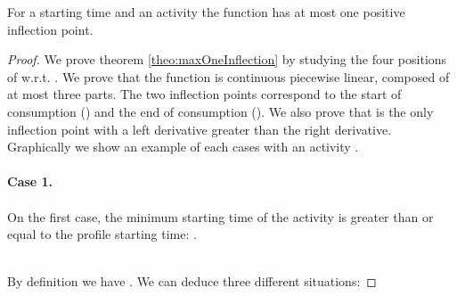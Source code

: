 \documentclass{llncs}
\begin{document}
\begin{theorem}\label{theo:maxOneInflection}
For a starting time  and an activity  the function   has at most one positive inflection point.\end{theorem}
{\small
\begin{proof}
We  prove theorem \ref{theo:maxOneInflection} by studying the four positions of  w.r.t. .
We prove that the function  is continuous piecewise linear, composed of at most three parts.
The two inflection points correspond to the start of consumption () 
and the end of consumption (). We also prove that  is the only inflection point with a left derivative greater than the right derivative.
Graphically we show an example of each cases with an activity .

\paragraph{Case 1.}
\paragraph{}
\hspace{-0.15cm}\begin{minipage}{0.45\textwidth} 
On the first case, the minimum starting time of the activity  is greater than or equal to the profile starting time: 
.
\end{minipage}
\begin{minipage}{0.45\textwidth} 
   \hspace{0.5cm}
\label{Fig:case1}
\end{minipage}\\
By definition we have .
We can deduce three different situations:


\end{proof}}
\end{document}
